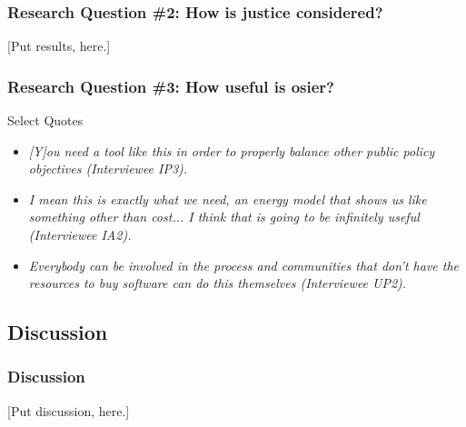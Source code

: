 \begin{frame}
    \frametitle{Research Question \#2: How is justice considered?}

    [Put results, here.]
\end{frame}

\begin{frame}
    \frametitle{Research Question \#3: How useful is \gls{osier}?}

    \begin{block}{Select Quotes}
        \begin{itemize}[<+->]
            \item   \textit{[Y]ou need a tool like this in order to properly balance other
                        public policy objectives (Interviewee IP3).}  
            \item \textit{I mean this is exactly what we need, an energy model that shows us
                        like something other than cost... I think that is going to be infinitely
                        useful (Interviewee IA2).}
            \item \textit{Everybody can be involved in the process and communities that don’t
                        have the resources to buy software can do this themselves (Interviewee UP2).}
        \end{itemize}
    \end{block}

\end{frame}

\subsection{Discussion}
\begin{frame}
    \frametitle{Discussion}

    [Put discussion, here.]
\end{frame}